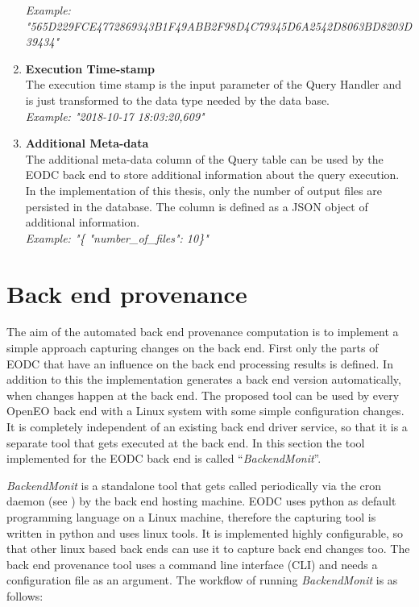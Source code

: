\documentclass[draft,final]{vutinfth} %
\begin{document}
\begin{enumerate}
	\textit{Example: "565D229FCE4772869343B1F49ABB2F98D4C79345D6A2542D8063BD8203D39434"} 
	\item \textbf{Execution Time-stamp} \\
	The execution time stamp is the input parameter of the Query Handler and is just transformed to the data type needed by the data base. 	\\
	\textit{Example: "2018-10-17 18:03:20,609"}  
	\item \textbf{Additional Meta-data} \\
	The additional meta-data column of the Query table can be used by the EODC back end to store additional information about the query execution. In the implementation of this thesis, only the number of output files are persisted in the database. The column is defined as a JSON object of additional information. \\
	\textit{Example: "\{ "number\_of\_files": 10\}"}    	 
\end{enumerate}

\section{Back end provenance}\label{Implementation:Back end provenance}
The aim of the automated back end provenance computation is to implement a simple approach capturing changes on the back end. First only the parts of EODC that have an influence on the back end processing results is defined. In addition to this the implementation generates a back end version automatically, when changes happen at the back end. The proposed tool can be used by every OpenEO back end with a Linux system with some simple configuration changes. It is completely independent of an existing back end driver service, so that it is a separate tool that gets executed at the back end. In this section the tool implemented for the EODC back end is called “\textit{BackendMonit}”. 


\textit{BackendMonit} is a standalone tool that gets called periodically via the cron daemon (see \cite{crontab}) by the back end hosting machine. EODC uses python as default programming language on a Linux machine, therefore the capturing tool is written in python and uses linux tools. It is implemented highly configurable, so that other linux based back ends can use it to capture back end changes too. The back end provenance tool uses a command line interface (CLI) and needs a configuration file as an argument. 
The workflow of running \textit{BackendMonit} is as follows: 
\end{document}

